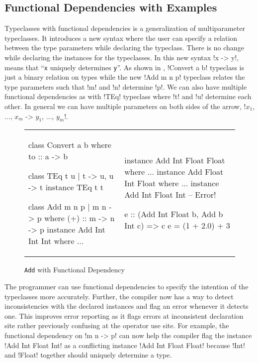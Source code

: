 \documentclass[format=sigplan,manuscript,review,screen,nonacm,margin=1in]{acmart}
\begin{document}
\subsection{Functional Dependencies with Examples}\label{subsec:fd}
Typeclasses with functional dependencies\cite{jones_tcfd_2000} is a generalization of multiparameter typeclasses.
It introduces a new syntax where the user can specify a relation between the type parameters
while declaring the typeclass. There is no change while declaring the instances for the typeclasses.
In this new syntax !x -> y!, means that ``\texttt{x} uniquely determines \texttt{y}''.
As shown in , !Convert a b! typeclass is just a binary relation on types while 
the new !Add m n p! typeclass relates the type parameters such that !m! and !n! determine !p!.
We can also have multiple functional dependencies as with !TEq! typeclass where !t! and !u! determine
each other. In general we can have multiple parameters on both sides of the arrow,
!$x_1$, ..., $x_m$ -> $y_1$, ..., $y_m$!.
\begin{figure}[h t]
  \begin{tabular}{l l}
    \begin{code}
      class Convert a b where
         to :: a -> b

      class TEq t u | t -> u, u -> t
      instance TEq t t
      
      class Add m n p | m n -> p where
        (+) :: m -> n -> p
      instance Add Int Int Int where
         ... 
    \end{code}&%
    \begin{code}
      instance Add Int Float Float where
         ...
      instance Add Float Int Float where
         ...
      instance Add Int Float Int -- Error!

      e :: (Add Int Float b, Add b Int c) => c
      e = (1 + 2.0) + 3
    \end{code}
  \end{tabular}
  \caption{\texttt{Add} with Functional Dependency}
  \label{fig:add-tc-fd}
\end{figure}
The programmer can use functional dependencies to specify the intention of the typeclasses
more accurately. Further, the compiler now has a way to detect inconsistencies with
the declared instances and flag an error whenever it detects one.
This improves error reporting as it flags errors at inconsistent declaration site
rather previously confusing at the operator use site. For example,
the functional dependency on !m n -> p! can now help the compiler flag
the instance !Add Int Float Int! as a conflicting instance
!Add Int Float Float! because !Int! and !Float! together should uniquely determine a type.
\end{document}
